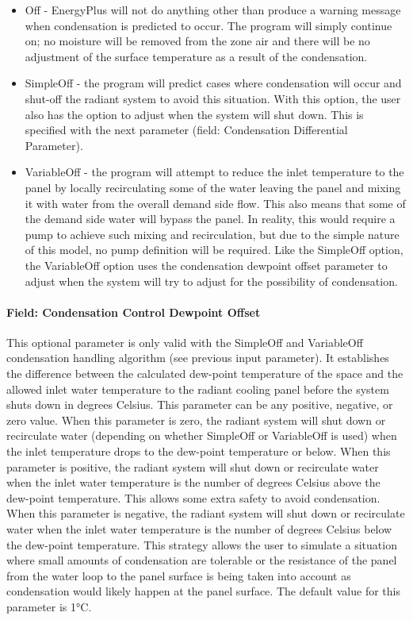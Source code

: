 \begin{itemize}
\item
  Off - EnergyPlus will not do anything other than produce a warning message when condensation is predicted to occur. The program will simply continue on; no moisture will be removed from the zone air and there will be no adjustment of the surface temperature as a result of the condensation.
\item
  SimpleOff - the program will predict cases where condensation will occur and shut-off the radiant system to avoid this situation. With this option, the user also has the option to adjust when the system will shut down. This is specified with the next parameter (field: Condensation Differential Parameter).
\item
  VariableOff - the program will attempt to reduce the inlet temperature to the panel by locally recirculating some of the water leaving the panel and mixing it with water from the overall demand side flow.  This also means that some of the demand side water will bypass the panel. In reality, this would require a pump to achieve such mixing and recirculation, but due to the simple nature of this model, no pump definition will be required. Like the SimpleOff option, the VariableOff option uses the condensation dewpoint offset parameter to adjust when the system will try to adjust for the possibility of condensation.
\end{itemize}

\paragraph{Field: Condensation Control Dewpoint Offset}\label{field-condensation-control-dewpoint-offset}

This optional parameter is only valid with the SimpleOff and VariableOff condensation handling algorithm (see previous input parameter). It establishes the difference between the calculated dew-point temperature of the space and the allowed inlet water temperature to the radiant cooling panel before the system shuts down in degrees Celsius. This parameter can be any positive, negative, or zero value. When this parameter is zero, the radiant system will shut down or recirculate water (depending on whether SimpleOff or VariableOff is used) when the inlet temperature drops to the dew-point temperature or below. When this parameter is positive, the radiant system will shut down or recirculate water when the inlet water temperature is the number of degrees Celsius above the dew-point temperature. This allows some extra safety to avoid condensation. When this parameter is negative, the radiant system will shut down or recirculate water when the inlet water temperature is the number of degrees Celsius below the dew-point temperature. This strategy allows the user to simulate a situation where small amounts of condensation are tolerable or the resistance of the panel from the water loop to the panel surface is being taken into account as condensation would likely happen at the panel surface. The default value for this parameter is 1°C.

